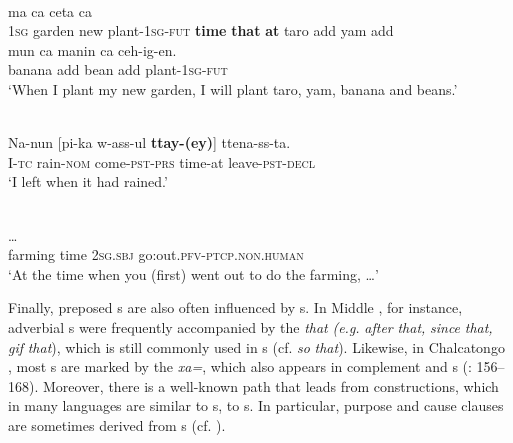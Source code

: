 \documentclass[output=paper]{langsci/langscibook}
\begin{document}
\ea\label{ex:diessel:12}
\\
   ma   ca  ceta  ca\\
        1\textsc{sg}   garden   new   plant-1\textsc{sg-fut}   \textbf{time}   \textbf{that}    \textbf{at}   taro   add  yam  add  \\
\gll   mun    ca    manin    ca  ceh-ig-en.\\
       banana   add bean    add  plant-\textsc{1sg-fut}\\
\glt `When I plant my new garden, I will plant taro, yam, banana and beans.'
\z

\ea\label{ex:diessel:13}
\\
\gll   Na-nun  [pi-ka  w-ass-ul   \textbf{ttay-(ey)}]    ttena-ss-ta.\\
       I-\textsc{tc}  rain-\textsc{nom}  come-\textsc{pst-prs}  time-at     leave-\textsc{pst-decl}\\
\glt   `I left when it had rained.' 
\z

\ea\label{ex:diessel:14}
\\
 …\\
       farming  time   2\textsc{sg.sbj}  go:out.\textsc{pfv}-\textsc{ptcp.non.human} \\
\glt   `At the time when you (first) went out to do the farming, …'
\z

Finally, preposed s are also often influenced by s. In Middle , for instance, adverbial s were frequently accompanied by the  \textit{that} \textit{(e.g.} \textit{after} \textit{that,} \textit{since} \textit{that,} \textit{gif} \textit{that}), which is still commonly used in s (cf. \textit{so} \textit{that}). Likewise, in Chalcatongo , most s are marked by the  \textit{xa=}, which also appears in complement and s (\citealt{Macaulay1996}: 156--168). Moreover, there is a well-known path that leads from  constructions, which in many languages are similar to s, to s. In particular, purpose and cause clauses are sometimes derived from s (cf. \citealt{Güldemann2008}). 
\end{document}
